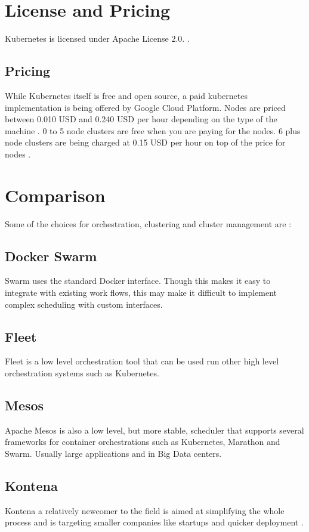 \documentclass[9pt,twocolumn,twoside]{../../styles/osajnl}
\begin{document}
\section{License and Pricing}
Kubernetes is licensed under Apache License 2.0. \cite{www-kuberneteslic}.

\subsection{Pricing}
While Kubernetes itself is free and open source, a paid kubernetes implementation is being offered by Google Cloud Platform.
Nodes are priced between 0.010 USD and 0.240 USD per hour depending on the type of the machine \cite{www-googlecontengpricing}.
0 to 5 node clusters are free when you are paying for the nodes.
6 plus node clusters are being charged at 0.15  USD per hour on top of the price for nodes \cite{www-googlecloudpricing}.
\section{Comparison}
Some of the choices for orchestration, clustering and cluster management are \cite{www-kubernetesarticle}:
\subsection{Docker Swarm}
 Swarm uses the standard  Docker interface. Though this makes it easy to integrate with existing work flows, this may make it difficult to implement complex scheduling with custom interfaces.
\subsection{Fleet}
Fleet is a low level orchestration tool that can be used run other high level orchestration systems such as Kubernetes.
\subsection{Mesos}
Apache Mesos is also a low level, but more stable, scheduler that supports several frameworks for container orchestrations such as Kubernetes, Marathon and Swarm. Usually large applications and in Big Data centers.
\subsection{Kontena}
Kontena a relatively newcomer to the field is aimed at simplifying the whole process and is targeting smaller companies like startups and quicker deployment \cite{www-kontenasite}.
\end{document}
